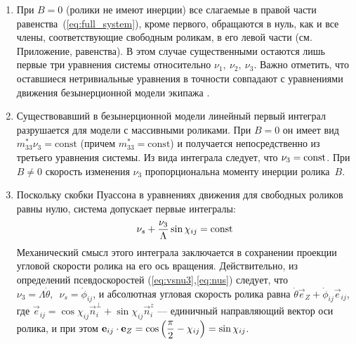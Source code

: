 \begin{enumerate}[wide]
    \item При $B = 0$ (ролики не имеют инерции) все слагаемые в правой части равенства~(\ref{eq:full_system}), кроме первого, обращаются в нуль, как и все члены, соответствующие свободным роликам, в его левой части (см. Приложение, равенства). В этом случае существенными остаются лишь первые три уравнения системы относительно $\nu_1,\ \nu_2,\ \nu_3$. Важно отметить, что оставшиеся нетривиальные уравнения в точности совпадают с уравнениями движения безынерционной модели экипажа \cite{ZobovaTatarinovPMM}.
    \item Существовавший в безынерционной модели линейный первый интеграл \cite{ZobovaTatarinovPMM} разрушается для модели с массивными роликами. При $B = 0$ он имеет вид $m_{33}^*\nu_3 = \mathrm{const}$ (причем $m^*_{33} = \mathrm{const}$) и получается непосредственно из третьего уравнения системы. Из вида интеграла следует, что $\nu_3 = \mathrm{const}$. При $B \neq 0$ скорость изменения $\nu_3$ пропорциональна моменту инерции ролика~$B$.
    \item Поскольку скобки Пуассона в уравнениях движения для свободных роликов равны нулю, система допускает первые интегралы:
    \begin{equation}\label{int_free_roller}
        \nu_s + \displaystyle\frac{\displaystyle \nu_3}{\displaystyle \Lambda}\sin\chi_{ij} = \mathrm{const}
    \end{equation}
    Механический смысл этого интеграла заключается в сохранении проекции угловой скорости ролика на его ось вращения. Действительно, из определений псевдоскоростей (\ref{eq:vsnu3},\ref{eq:nus}) следует, что  $\nu_3 = \Lambda\dot{\theta}, \enspace \nu_s = \dot{\phi}_{ij}$, и абсолютная угловая скорость ролика равна $\dot{\theta}\vec{e}_Z + \dot{\phi}_{ij}\vec{e}_{ij}$, где $\vec{e}_{ij} = \cos\chi_{ij}\vec{n}_i^\perp + \sin\chi_{ij}\vec{n}_i^z$ --- единичный направляющий вектор оси ролика, и при этом $\boldsymbol{\mathbf{e}}_{ij} \cdot \boldsymbol{\mathbf{e}}_Z = \cos\left(\displaystyle\frac{\displaystyle \pi}{\displaystyle 2} - \chi_{ij}\right) = \sin\chi_{ij}$.

\end{enumerate}
